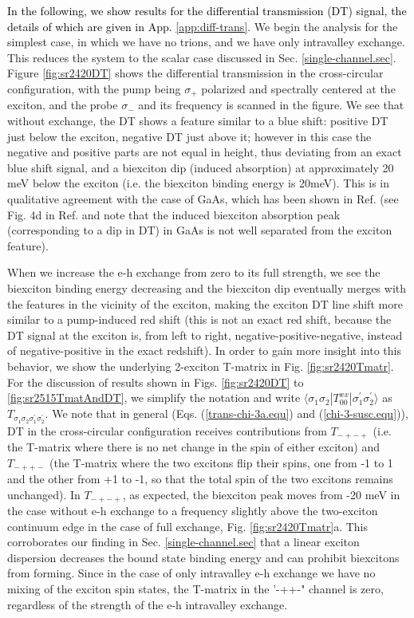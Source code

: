 \documentclass[aps,prb,superscriptaddress,letterpaper,amsmath,amssymb,twocolumn,preprintnumbers]{revtex4}
\newcommand\revisionB[1]{\textcolor{black}{#1}}
\begin{document}
\revisionB{
In the following, we show results for the differential transmission (DT) signal, the details of which are given in App. \ref{app:diff-trans}.}
%
We begin the analysis for the simplest case, in which we have no trions, and we have only intravalley exchange. This reduces the system to the scalar case discussed in Sec. \ref{single-channel.sec}.
Figure \ref{fig:sr2420DT} shows the differential transmission  in the cross-circular configuration, with the pump being $\sigma_+$ polarized and spectrally centered at the exciton, and the probe $\sigma_-$ and its frequency is scanned in the figure.
 We see that without exchange, the DT shows a feature similar to a blue shift: positive DT just below the exciton, negative DT just above it; however in this case the negative and positive parts are not equal in height, thus deviating from an exact blue shift signal,
  and a biexciton dip (induced absorption) at approximately 20 meV below the exciton (i.e. the biexciton binding energy is 20meV).
  This is in qualitative agreement with the case of GaAs, which has been shown in Ref.  (see Fig. 4d in Ref.  and note that the induced biexciton absorption peak (corresponding to a dip in DT) in GaAs is not well separated from the exciton feature).

  When we increase the e-h exchange from zero to its full strength, we see the biexciton binding energy decreasing and the biexciton dip eventually merges with the features in the vicinity of the exciton, making the exciton DT line shift more similar to a pump-induced red shift (this is not an exact red shift, because the DT signal at the exciton is, from left to right, negative-positive-negative, instead of negative-positive in the exact redshift).
 In order to gain more insight into this behavior, we show the underlying 2-exciton T-matrix in Fig. \ref{fig:sr2420Tmatr}.
 For the discussion of results shown in Figs. \ref{fig:sr2420DT} to \ref{fig:sr2515TmatAndDT}, we simplify the notation and write $\langle \sigma_1 \sigma_2 | T^{xx}_{00} | \sigma^{\prime}_1 \sigma^{\prime}_2 \rangle$ as $T_{\sigma_1 \sigma_2 \sigma^{\prime}_1 \sigma^{\prime}_2}$. We note that in general (Eqs. (\ref{trans-chi-3a.equ}) and (\ref{chi-3-susc.equ})), DT in the cross-circular configuration receives contributions from $T_{-+-+}$ (i.e. the T-matrix where there is no net change in the spin of either exciton) and $T_{-++-}$ (the T-matrix where the two excitons flip their spins, one from -1 to 1 and the other from +1 to -1, so that the total spin of the two excitons remains unchanged). In $T_{-+-+}$, as expected, the biexciton peak
  moves from -20 meV in the case without e-h exchange to a frequency slightly above the two-exciton continuum edge in the case of full exchange,  Fig. \ref{fig:sr2420Tmatr}a.
 This corroborates our finding in Sec. \ref{single-channel.sec} that a linear exciton dispersion decreases the bound state binding energy and can prohibit biexcitons from forming. Since in the case of only intravalley e-h exchange we have no
  mixing of the exciton spin states, the T-matrix in the '-++-" channel
   is zero, regardless of the strength of the e-h intravalley exchange.
\end{document}
